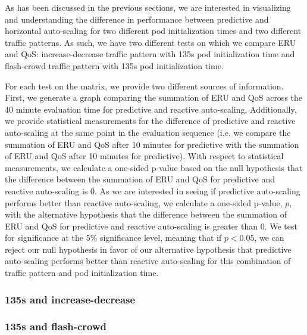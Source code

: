 As has been discussed in the previous sections, we are interested in visualizing
and understanding the difference in performance between predictive and
horizontal auto-scaling for two different pod initialization times and two
different traffic patterns. As such, we have two different tests on which we
compare ERU and QoS: increase-decrease traffic pattern with 135s pod
initialization time and flash-crowd traffic pattern with 135s pod initialization time.

For each test on the matrix, we provide two different sources of information.
First, we generate a graph comparing the summation of ERU and QoS across the 40
minute evaluation time for predictive and reactive auto-scaling. Additionally,
we provide statistical measurements for the difference of predictive and
reactive auto-scaling at the same point in the evaluation sequence (i.e. we
compare the summation of ERU and QoS after 10 minutes for predictive with the
summation of ERU and QoS after 10 minutes for predictive). With respect to
statistical measurements, we calculate a one-sided p-value
based on the null hypothesis that the difference
between the summation of ERU and QoS for predictive and reactive auto-scaling is
$0$. As we are interested in seeing if predictive auto-scaling performs better
than reactive auto-scaling, we calculate a one-sided p-value, $p$, with the alternative
hypothesis that the difference between the summation of ERU and QoS for
predictive and reactive auto-scaling is greater than $0$. We test for
significance at the $5\%$ significance level, meaning that if $p < 0.05$, we can
reject our null hypothesis in favor of our alternative hypothesis that
predictive auto-scaling performs better than reactive auto-scaling for this
combination of traffic pattern and pod initialization time.

\subsubsection{135s and increase-decrease}



\subsubsection{135s and flash-crowd}


